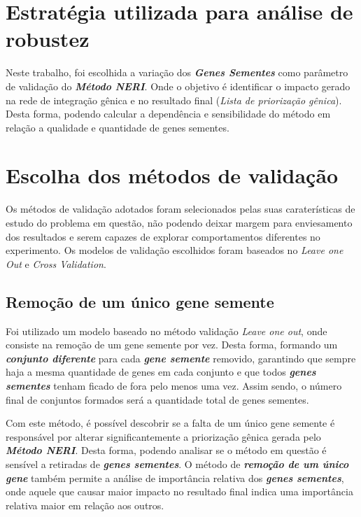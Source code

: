\section{Estratégia utilizada para análise de robustez}

%
Neste trabalho, foi escolhida a variação dos \textsl{\textbf{Genes Sementes}} como parâmetro de validação do \textsl{\textbf{Método NERI}}. Onde o objetivo é identificar o impacto gerado na rede de integração gênica e no resultado final (\textsl{Lista de priorização gênica}). Desta forma, podendo calcular a dependência e sensibilidade do método em relação a qualidade e quantidade de genes sementes.



\section{Escolha dos métodos de validação}

%
Os métodos de validação adotados foram selecionados pelas suas caraterísticas de estudo do problema em questão, não podendo deixar margem para enviesamento dos resultados e serem capazes de explorar comportamentos diferentes no experimento. Os modelos de validação escolhidos foram baseados no \textit{Leave one Out} e \textit{Cross Validation}.


\subsection{Remoção de um único gene semente}

Foi utilizado um modelo baseado no método validação \textsl{Leave one out}, onde consiste na remoção de um gene semente por vez. Desta forma, formando um \textsl{\textbf{conjunto diferente}} para cada \textsl{\textbf{gene semente}} removido, garantindo que sempre haja a mesma quantidade de genes em cada conjunto e que todos \textsl{\textbf{genes sementes}} tenham ficado de fora pelo menos uma vez. Assim sendo, o número final de conjuntos formados será a quantidade total de genes sementes.

%
Com este método, é possível descobrir se a falta de um único gene semente é responsável por alterar significantemente a priorização gênica gerada pelo \textsl{\textbf{Método NERI}}. Desta forma, podendo analisar se o método em questão é sensível a retiradas de \textsl{\textbf{genes sementes}}. 
O método de \textsl{\textbf{remoção de um único gene}} também permite a análise de importância relativa dos \textsl{\textbf{genes sementes}}, onde aquele que causar maior impacto no resultado final indica uma importância relativa maior em relação aos outros. 

